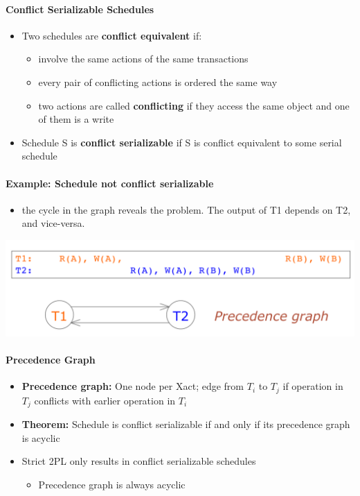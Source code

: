\paragraph{Conflict Serializable Schedules}

\begin{itemize}
\item Two schedules are \textbf{conflict equivalent} if:
  \begin{itemize}
  \item involve the same actions of the same transactions
  \item every pair of conflicting actions is ordered the
    same way
  \item two actions are called \textbf{conflicting} if they access
    the same object and one of them is a write
  \end{itemize}

\item Schedule S is \textbf{conflict serializable} if S is conflict
  equivalent to some serial schedule
\end{itemize}

\paragraph{Example: Schedule not conflict serializable}
\begin{itemize}
\item the cycle in the graph reveals the problem. The
  output of T1 depends on T2, and vice-versa.
\end{itemize}

\includegraphics[scale=0.15]{graphics/not-conflict-serializable.png}


\paragraph{Precedence Graph}
\begin{itemize}
\item \textbf{Precedence graph:} One node per Xact; edge from
  $T_i$ to $T_j$ if operation in $T_j$ conflicts with earlier operation
  in $T_i$

\item \textbf{Theorem:} Schedule is conflict serializable if
  and only if its precedence graph is acyclic
\item Strict 2PL only results in conflict serializable schedules
  \begin{itemize}
  \item Precedence graph is always acyclic
  \end{itemize}
\end{itemize}

